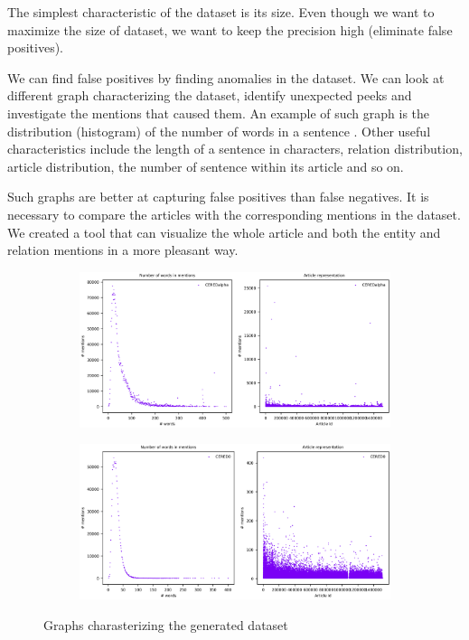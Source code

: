 The simplest characteristic of the dataset is its size. Even though we want to maximize the size of dataset, we want to keep the precision high (eliminate false positives).

We can find false positives by finding anomalies in the dataset. We can look at different graph characterizing the dataset, identify unexpected peeks and investigate the mentions that caused them. An example of such graph is the distribution (histogram) of the number of words in a sentence . Other useful characteristics include the length of a sentence in characters, relation distribution, article distribution, the number of sentence within its article and so on.

Such graphs are better at capturing false positives than false negatives. It is necessary to compare the articles with the corresponding mentions in the dataset. We created a tool that can visualize the whole article and both the entity and relation mentions in a more pleasant way.

\begin{figure}
\begin{subfigure}{1\textwidth}
\centering
\includegraphics[width = 1\textwidth]{./img/Histograms_2020-07-19_21-00-53_CEREDalpha.png}
\end{subfigure}
\begin{subfigure}{1\textwidth}
\centering
\includegraphics[width = 1\textwidth]{./img/Histograms_2020-07-19_21-00-53_CERED0.png}
\end{subfigure}
\caption{Graphs charasterizing the generated dataset}

\end{figure}

